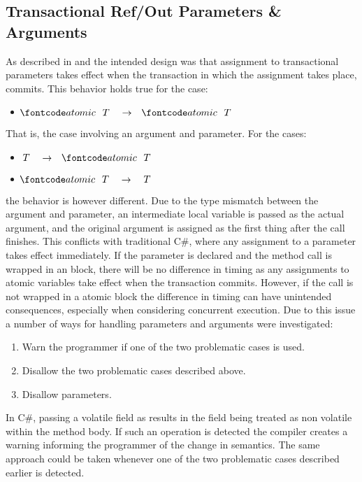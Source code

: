 \subsection{Transactional Ref/Out Parameters \& Arguments}
As described in  and  the intended design was that assignment to transactional  parameters takes effect when the transaction in which the assignment takes place, commits. This behavior holds true for the case:
\begin{itemize}
	\item $\bscode{atomic} \quad T \quad \rightarrow \quad \bscode{atomic} \quad T$
\end{itemize}
That is, the case involving an  argument and parameter. For the cases:
\begin{itemize}
	\item $T \quad \rightarrow \quad \bscode{atomic} \quad T$
	\item $\bscode{atomic} \quad T \quad \rightarrow \quad T$
\end{itemize}
the behavior is however different. Due to the type mismatch between the argument and parameter, an intermediate local variable is passed as the actual argument, and the original argument is assigned as the first thing after the call finishes. This conflicts with traditional C\#, where any assignment to a  parameter takes effect immediately\cite[p. 76]{sestoft2011c}. If the parameter is declared  and the method call is wrapped in an  block, there will be no difference in timing as any assignments to atomic variables take effect when the transaction commits. However, if the call is not wrapped in a atomic block the difference in timing can have unintended consequences, especially when considering concurrent execution. Due to this issue a number of ways for handling  parameters and arguments were investigated:
\begin{enumerate}
	\item Warn the programmer if one of the two problematic cases is used.
	\item Disallow the two problematic cases described above.
	\item Disallow  parameters.
\end{enumerate}
In C\#, passing a volatile field as  results in the field being treated as non volatile within the method body\cite{csharpVolatileRef}. If such an operation is detected the compiler creates a warning informing the programmer of the change in semantics. The same approach could be taken whenever one of the two problematic cases described earlier is detected.

